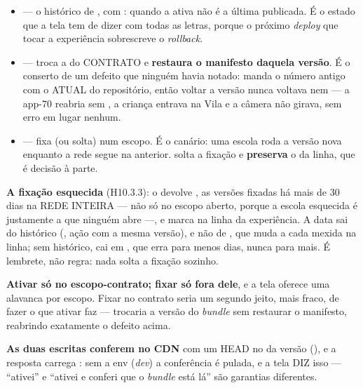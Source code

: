 \begin{itemize}
  \item {} --- o histórico de
    , com :  quando a ativa
    não é a última publicada. É o estado que a tela tem de dizer com todas as
    letras, porque o próximo \emph{deploy} que tocar a experiência sobrescreve o
    \emph{rollback}.
  \item {} --- troca a
     do CONTRATO e \textbf{restaura o manifesto daquela
    versão}. É o conserto de um defeito que ninguém havia notado:
     manda o número antigo com o
     ATUAL do repositório, então voltar a versão nunca
    voltava  nem  --- a app-70 reabria sem
    , a criança entrava na Vila e a câmera não girava,
    sem erro em lugar nenhum.
  \item {} --- fixa (ou solta)
     num escopo. É o canário: uma escola roda a versão nova
    enquanto a rede segue na anterior.  solta a fixação e
    \textbf{preserva} o  da linha, que é decisão à parte.
\end{itemize}

\textbf{A fixação esquecida} (H10.3.3): o  devolve
, as versões fixadas há mais de 30 dias na REDE INTEIRA
--- não só no escopo aberto, porque a escola esquecida é justamente a que
ninguém abre ---, e marca  na linha da experiência. A data
sai do histórico (, ação  com a mesma
versão), e não de , que muda a cada mexida na linha; sem
histórico, cai em , que erra para menos dias, nunca para mais.
É lembrete, não regra: nada solta a fixação sozinho.

\textbf{Ativar só no escopo-contrato; fixar só fora dele}, e a tela oferece uma
alavanca por escopo. Fixar no contrato seria um segundo jeito, mais fraco, de
fazer o que ativar faz --- trocaria a versão do \emph{bundle} sem restaurar o
manifesto, reabrindo exatamente o defeito acima.

\textbf{As duas escritas conferem no CDN} com um HEAD no  da
versão (), e a resposta carrega : sem a env
(\emph{dev}) a conferência é pulada, e a tela DIZ isso --- \enquote{ativei} e
\enquote{ativei e conferi que o \emph{bundle} está lá} são garantias diferentes.

